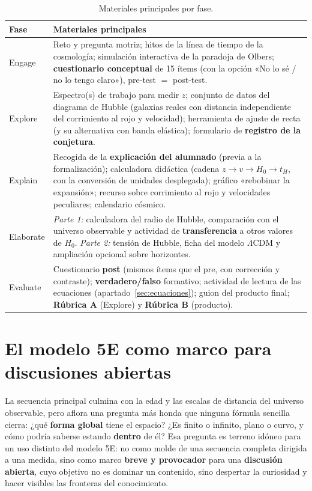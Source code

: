\begin{table}[ht]
\centering
\caption{Materiales principales por fase.}\label{tab:materiales}
\begin{tabularx}{\textwidth}{|>{\raggedright\arraybackslash}p{2.4cm}|>{\raggedright\arraybackslash}X|}
\hline
\rowcolor{naranja}
{\color{white}\textbf{Fase}} & {\color{white}\textbf{Materiales principales}} \\ \hline
Engage & Reto y pregunta motriz; hitos de la línea de tiempo de la cosmología; simulación interactiva de la paradoja de Olbers; \textbf{cuestionario conceptual} de 15 ítems (con la opción «No lo sé / no lo tengo claro»), pre-test $=$ post-test. \\ \hline
Explore & Espectro(s) de trabajo para medir $z$; conjunto de datos del diagrama de Hubble (galaxias reales con distancia independiente del corrimiento al rojo y velocidad); herramienta de ajuste de recta (y su alternativa con banda elástica); formulario de \textbf{registro de la conjetura}. \\ \hline
Explain & Recogida de la \textbf{explicación del alumnado} (previa a la formalización); calculadora didáctica (cadena $z \rightarrow v \rightarrow H_{0} \rightarrow t_H$, con la conversión de unidades desplegada); gráfico «rebobinar la expansión»; recurso sobre corrimiento al rojo y velocidades peculiares; calendario cósmico. \\ \hline
Elaborate & \textit{Parte 1:} calculadora del radio de Hubble, comparación con el universo observable y actividad de \textbf{transferencia} a otros valores de $H_{0}$. \textit{Parte 2:} tensión de Hubble, ficha del modelo $\Lambda$CDM y ampliación opcional sobre horizontes. \\ \hline
Evaluate & Cuestionario \textbf{post} (mismos ítems que el pre, con corrección y contraste); \textbf{verdadero/falso} formativo; actividad de lectura de las ecuaciones (apartado~\ref{sec:ecuaciones}); guion del producto final; \textbf{Rúbrica A} (Explore) y \textbf{Rúbrica B} (producto). \\ \hline
\end{tabularx}
\end{table}

\section{El modelo 5E como marco para discusiones abiertas}\label{sec:extension}

La secuencia principal culmina con la edad y las escalas de distancia del universo observable, pero aflora una pregunta más honda que ninguna fórmula sencilla cierra: ¿qué \textbf{forma global} tiene el espacio? ¿Es finito o infinito, plano o curvo, y cómo podría saberse estando \textbf{dentro} de él? Esa pregunta es terreno idóneo para un uso distinto del modelo 5E: no como molde de una secuencia completa dirigida a una medida, sino como marco \textbf{breve y provocador} para una \textbf{discusión abierta}, cuyo objetivo no es dominar un contenido, sino despertar la curiosidad y hacer visibles las fronteras del conocimiento.

